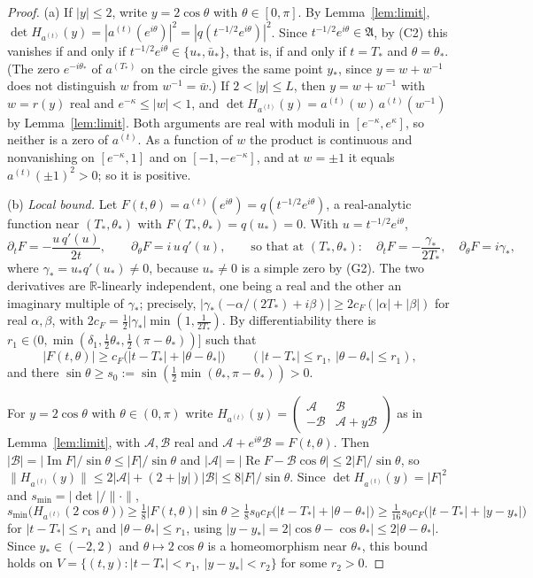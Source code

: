 \documentclass[11pt]{amsart}
\theoremstyle{definition}
\theoremstyle{remark}
\numberwithin{equation}{section}
\newcommand{\R}{\mathbb{R}}
\DeclareMathOperator{\re}{Re}
\DeclareMathOperator{\im}{Im}
\begin{document}
\begin{proof}
(a) If $|y|\le2$, write $y=2\cos\theta$ with $\theta\in[0,\pi]$. By Lemma~\ref{lem:limit}, $\det H_{a^{(t)}}(y)=|a^{(t)}(e^{i\theta})|^2=|q(t^{-1/2}e^{i\theta})|^2$. Since $t^{-1/2}e^{i\theta}\in\mathfrak A$, by (C2) this vanishes if and only if $t^{-1/2}e^{i\theta}\in\{u_*,\bar u_*\}$, that is, if and only if $t=T_*$ and $\theta=\theta_*$. (The zero $e^{-i\theta_*}$ of $a^{(T_*)}$ on the circle gives the same point $y_*$, since $y=w+w^{-1}$ does not distinguish $w$ from $w^{-1}=\bar w$.) If $2<|y|\le L$, then $y=w+w^{-1}$ with $w=r(y)$ real and $e^{-\kappa}\le|w|<1$, and $\det H_{a^{(t)}}(y)=a^{(t)}(w)\,a^{(t)}(w^{-1})$ by Lemma~\ref{lem:limit}. Both arguments are real with moduli in $[e^{-\kappa},e^\kappa]$, so neither is a zero of $a^{(t)}$. As a function of $w$ the product is continuous and nonvanishing on $[e^{-\kappa},1]$ and on $[-1,-e^{-\kappa}]$, and at $w=\pm1$ it equals $a^{(t)}(\pm1)^2>0$; so it is positive.

(b) \emph{Local bound.} Let $F(t,\theta)=a^{(t)}(e^{i\theta})=q(t^{-1/2}e^{i\theta})$, a real-analytic function near $(T_*,\theta_*)$ with $F(T_*,\theta_*)=q(u_*)=0$. With $u=t^{-1/2}e^{i\theta}$,
\[
\partial_tF=-\frac{u\,q'(u)}{2t},\qquad\partial_\theta F=i\,u\,q'(u),\qquad\text{so that at }(T_*,\theta_*):\quad\partial_tF=-\frac{\gamma_*}{2T_*},\quad\partial_\theta F=i\gamma_*,
\]
where $\gamma_*=u_*q'(u_*)\ne0$, because $u_*\ne0$ is a simple zero by (G2). The two derivatives are $\R$-linearly independent, one being a real and the other an imaginary multiple of $\gamma_*$; precisely, $|\gamma_*(-\alpha/(2T_*)+i\beta)|\ge2c_F(|\alpha|+|\beta|)$ for real $\alpha,\beta$, with $2c_F=\frac12|\gamma_*|\min(1,\frac1{2T_*})$. By differentiability there is $r_1\in(0,\min(\delta_1,\frac12\theta_*,\frac12(\pi-\theta_*))]$ such that
\[
|F(t,\theta)|\ge c_F\bigl(|t-T_*|+|\theta-\theta_*|\bigr)\qquad(|t-T_*|\le r_1,\ |\theta-\theta_*|\le r_1),
\]
and there $\sin\theta\ge s_0:=\sin(\frac12\min(\theta_*,\pi-\theta_*))>0$.

For $y=2\cos\theta$ with $\theta\in(0,\pi)$ write $H_{a^{(t)}}(y)=\begin{pmatrix}\mathcal A&\mathcal B\\-\mathcal B&\mathcal A+y\mathcal B\end{pmatrix}$ as in Lemma~\ref{lem:limit}, with $\mathcal A,\mathcal B$ real and $\mathcal A+e^{i\theta}\mathcal B=F(t,\theta)$. Then $|\mathcal B|=|\im F|/\sin\theta\le|F|/\sin\theta$ and $|\mathcal A|=|\re F-\mathcal B\cos\theta|\le2|F|/\sin\theta$, so $\|H_{a^{(t)}}(y)\|\le2|\mathcal A|+(2+|y|)|\mathcal B|\le8|F|/\sin\theta$. Since $\det H_{a^{(t)}}(y)=|F|^2$ and $s_{\min}=|\det|/\|\cdot\|$,
\[
s_{\min}\bigl(H_{a^{(t)}}(2\cos\theta)\bigr)\ge\tfrac18|F(t,\theta)|\sin\theta\ge\tfrac18s_0c_F\bigl(|t-T_*|+|\theta-\theta_*|\bigr)\ge\tfrac1{16}s_0c_F\bigl(|t-T_*|+|y-y_*|\bigr)
\]
for $|t-T_*|\le r_1$ and $|\theta-\theta_*|\le r_1$, using $|y-y_*|=2|\cos\theta-\cos\theta_*|\le2|\theta-\theta_*|$. Since $y_*\in(-2,2)$ and $\theta\mapsto2\cos\theta$ is a homeomorphism near $\theta_*$, this bound holds on $V=\{(t,y):|t-T_*|<r_1,\ |y-y_*|<r_2\}$ for some $r_2>0$.


\end{proof}
\end{document}
